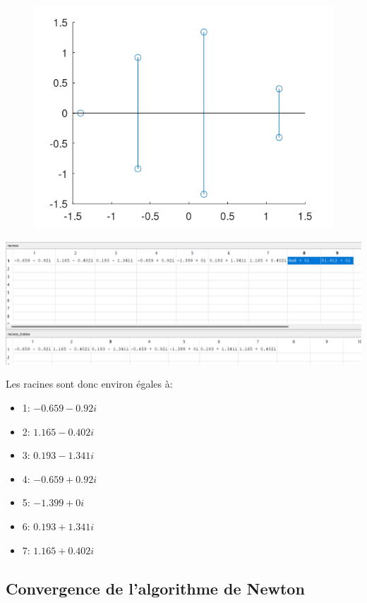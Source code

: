 \documentclass{article}
\begin{document}
	\begin{center}
		\begin{figure}[H]
			\includegraphics[scale=0.7]{./img/deg7newtonracines.png}
		\end{figure}
	\end{center}

	\includegraphics[scale=0.6]{./img/racines_new_deg7.png}
	
	Les racines sont donc environ égales à:
	
	\begin{itemize}
		\item 1: $-0.659-0.92i$
		\item 2: $1.165-0.402i$
		\item 3: $0.193-1.341i$
		\item 4: $-0.659+0.92i$
		\item 5: $-1.399+0i$
		\item 6: $0.193+1.341i$
		\item 7: $1.165+0.402i$
	\end{itemize}
	
	\newpage
	
	\subsection{Convergence de l'algorithme de Newton}
	
\end{document}
